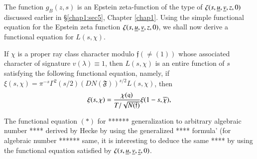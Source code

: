 The function $g_{B}(z,s)$ is an Epstein zeta-function of the type of
$\zeta(s,\ub{u},\break\ub{v},z,0)$ discussed earlier in \S \ref{chap1:sec5}, Chapter
\ref{chap1}. Using the simple functional equation for the Epstein zeta function
$\zeta(s,\underline{u},\underline{v},z,0)$, we shall now derive a functional
equation for $L(s,\chi)$.

\begin{proposition}\label{prop16}
If $\chi$ is a proper ray class character modulo $\mathfrak{f}(\neq
(1))$ whose associated character of signature $v(\lambda)\equiv 1$,
then $L(s,\chi)$ is an entire function of $s$ satisfying the following
functional equation, namely, if
$\xi(s,\chi)=\pi^{-s}\Gamma^{2}(s/2)(DN(\mathfrak{F}))^{s/2}L(s,\chi)$,
then 
$$
\xi(s,\chi)=\frac{\chi(\mathfrak{q})}{T/\sqrt{N(\mathfrak{f})}}\xi(1-s,\overline{\chi}), 
$$\pageoriginale
\end{proposition}

\begin{remark*}
The functional equation $(\ast)$ for ****** generalization to
arbitrary algebraic number **** derived by Hecke by using the
generalized **** formula' (for algebraic number ****** same, it is
interesting to deduce the same **** by using the functional equation
satisfied by $\zeta(s,\underline{u},\underline{v},\underline{z},0)$.
\end{remark*}

